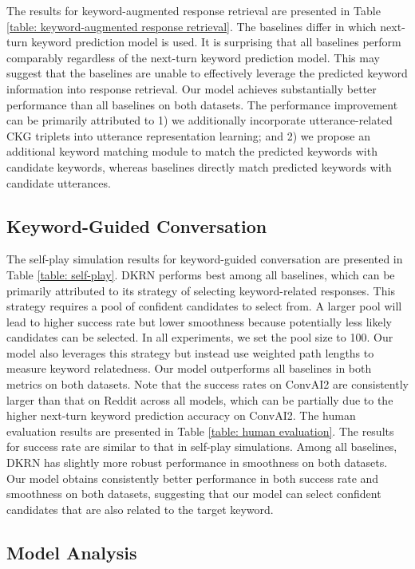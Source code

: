 \documentclass[letterpaper]{article} %
\begin{document}
The results for keyword-augmented response retrieval are presented in Table \ref{table: keyword-augmented response retrieval}. The baselines differ in which next-turn keyword prediction model is used. It is surprising that all baselines perform comparably regardless of the next-turn keyword prediction model. This may suggest that the baselines are unable to effectively leverage the predicted keyword information into response retrieval. Our model achieves substantially better performance than all baselines on both datasets. The performance improvement can be primarily attributed to 1) we additionally incorporate utterance-related CKG triplets into utterance representation learning; and 2) we propose an additional keyword matching module to match the predicted keywords with candidate keywords, whereas baselines directly match predicted keywords with candidate utterances.

\subsection{Keyword-Guided Conversation}
\label{sec: keyword-guided conversation}
The self-play simulation results for keyword-guided conversation are presented in Table \ref{table: self-play}. DKRN performs best among all baselines, which can be primarily attributed to its strategy of selecting keyword-related responses. This strategy requires a pool of confident candidates to select from. A larger pool will lead to higher success rate but lower smoothness because potentially less likely candidates can be selected. In all experiments, we set the pool size to 100. Our model also leverages this strategy but instead use weighted path lengths to measure keyword relatedness. Our model outperforms all baselines in both metrics on both datasets. Note that the success rates on ConvAI2 are consistently larger than that on Reddit across all models, which can be partially due to the higher next-turn keyword prediction accuracy on ConvAI2.  The human evaluation results are presented in Table \ref{table: human evaluation}. The results for success rate are similar to that in self-play simulations. Among all baselines, DKRN has slightly more robust performance in smoothness on both datasets. Our model obtains consistently better performance in both success rate and smoothness on both datasets, suggesting that our model can select confident candidates that are also related to the target keyword.

\subsection{Model Analysis}
\label{sec: model analysis}
\end{document}
